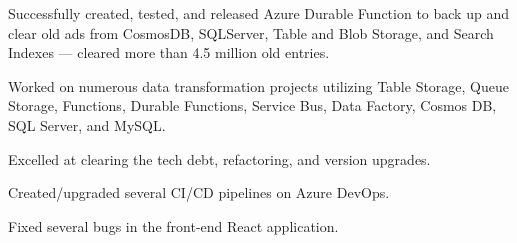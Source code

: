 \documentclass[letterpaper]{cv_12} %
\begin{document}
\begin{minipage}[t]{0.59\textwidth}
    \begin{tightitemize}
        \item Successfully created, tested, and released Azure Durable
        Function to back up and clear old ads from CosmosDB, SQLServer, Table
        and Blob
        Storage, and Search Indexes — cleared more than 4.5 million old
        entries.\@
        \item Worked on numerous data transformation projects utilizing
        Table Storage, Queue Storage, Functions, Durable Functions, Service
        Bus, Data
        Factory, Cosmos DB, SQL Server, and MySQL.\@
        \item Excelled at clearing the tech debt, refactoring, and
        version upgrades.
        \item Created/upgraded several CI/CD pipelines on Azure DevOps.
        \item Fixed several bugs in the front-end React application.
    \end{tightitemize}

    \sectionspace%


\end{minipage}%


\newpage %


\lastupdated%
\pagecounter%


\end{document}
